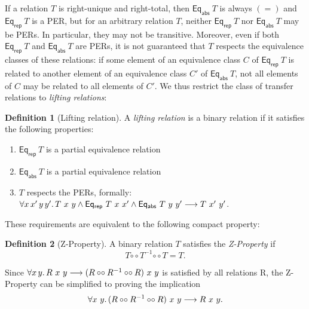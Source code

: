 \documentclass{article}
\theoremstyle{definition}
\newtheorem{definition}{Definition}[section]
\newcommand{\relcomp}{\mathbin{\circ\circ}}
\newcommand{\dom}{\mathsf{dom}}
\newcommand{\codom}{\mathsf{co\mhyphen{}dom}}
\newcommand{\eqrep}{\mathsf{Eq_{rep}}}
\newcommand{\eqabs}{\mathsf{Eq_{abs}}}
\newcommand{\liftrel}{lifting relation\xspace}
\newcommand{\liftrels}{lifting relations\xspace}
\begin{document}
If a relation \(T\) is right-unique and right-total,
then \(\eqabs\ T\) is always \((=)\) and \(\eqrep\ T\) is a PER,
but for an arbitrary relation \(T\),
neither \(\eqrep\ T\) nor \(\eqabs\ T\) may be PERs.
In particular, they may not be transitive.
Moreover, even if both \(\eqrep\ T\) and \(\eqabs\ T\) are PERs,
it is not guaranteed that \(T\) respects the equivalence classes of these relations:
if some element of an equivalence class $C$ of \(\eqrep\ T\) is related to another element of an equivalence class $C'$ of \(\eqabs\ T\),
not all elements of $C$ may be related to all elements of $C'$.
We thus restrict the class of transfer relations to \emph{\liftrels}:
\begin{definition}[Lifting relation]
  A \emph{\liftrel} is a binary relation if it satisfies the following properties:
	\begin{enumerate}
		\item \(\eqrep\ T\) is a partial equivalence relation
		\item \(\eqabs\ T\) is a partial equivalence relation
		\item $T$ respects the PERs, formally: \(\forall x\, x'\, y\, y'\ldotp T\ x\ y \land \eqrep\ T\ x\ x' \land \eqabs\ T\ y\ y' \longrightarrow T\ x'\ y'\).
	\end{enumerate}
\end{definition}
These requirements are equivalent to the following compact property:
\begin{definition}[Z-Property]
  A binary relation \(T\) satisfies the \emph{Z-Property} if
	\begin{equation*}
		T \relcomp T^{-1} \relcomp T = T \label{z-prop-def}.
	\end{equation*}
\end{definition}
Since \(\forall x\, y\ldotp R\ x\ y \longrightarrow (R \relcomp R^{-1} \relcomp R)\ x\ y\) is satisfied by all relations R, the Z-Property can be simplified to proving the implication
\begin{equation*}
	\forall x\ y\ldotp (R \relcomp R^{-1} \relcomp R)\ x\ y \longrightarrow R\ x\ y.
\end{equation*}
%
\end{document}
